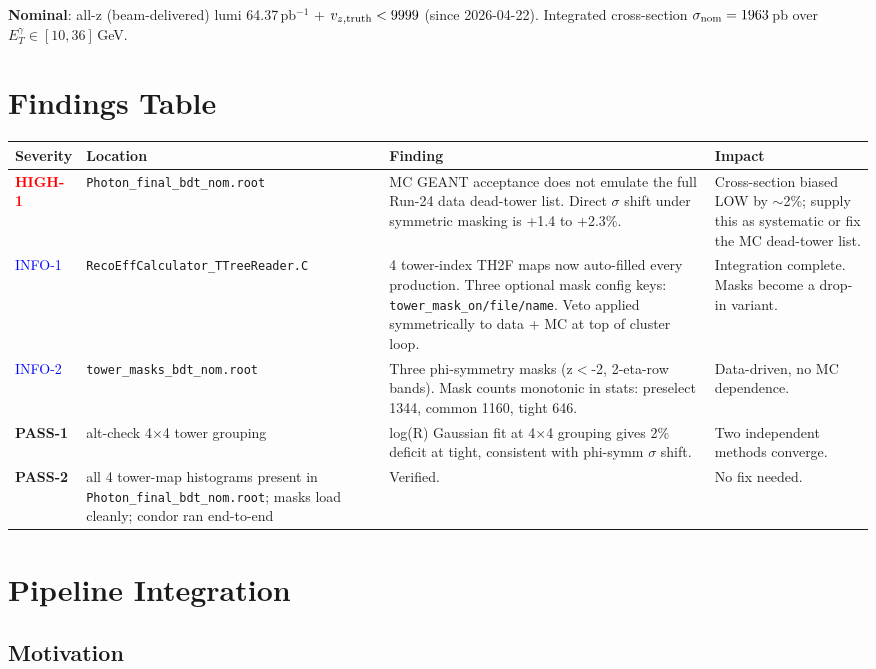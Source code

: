 \documentclass[11pt,a4paper]{article}
\newcommand{\etg}{\ensuremath{E_T^\gamma}}
\newcommand{\crit}[1]{\textcolor{red}{\textbf{#1}}}
\newcommand{\info}[1]{\textcolor{blue}{#1}}
\newcommand{\ok}[1]{\textcolor{green!50!black}{\textbf{#1}}}
\begin{document}
\textbf{Nominal}: all-z (beam-delivered) lumi 64.37\,pb$^{-1}$ +
$v_{z,{\rm truth}}<9999$ (since 2026-04-22). Integrated cross-section
$\sigma_{\rm nom} = 1963$\,pb over $\etg \in [10, 36]$\,GeV.

\section{Findings Table}

\begin{longtable}{@{}p{1.9cm}p{4.8cm}p{5.8cm}p{4.3cm}@{}}
\toprule
Severity & Location & Finding & Impact \\
\midrule
\crit{HIGH-1} & \texttt{Photon\_final\_bdt\_nom.root} &
MC GEANT acceptance does not emulate the full Run-24 data dead-tower
list. Direct $\sigma$ shift under symmetric masking is +1.4 to +2.3\%. &
Cross-section biased LOW by $\sim$2\%; supply this as systematic
or fix the MC dead-tower list. \\
\addlinespace
\info{INFO-1} & \texttt{RecoEffCalculator\_TTreeReader.C} &
4 tower-index TH2F maps now auto-filled every production. Three
optional mask config keys: \texttt{tower\_mask\_on/file/name}. Veto
applied symmetrically to data + MC at top of cluster loop. &
Integration complete. Masks become a drop-in variant. \\
\addlinespace
\info{INFO-2} & \texttt{tower\_masks\_bdt\_nom.root} &
Three phi-symmetry masks (z$<$-2, 2-eta-row bands). Mask counts
monotonic in stats: preselect 1344, common 1160, tight 646. &
Data-driven, no MC dependence. \\
\addlinespace
\ok{PASS-1} & alt-check 4$\times$4 tower grouping &
log(R) Gaussian fit at 4$\times$4 grouping gives
2\% deficit at tight, consistent with phi-symm $\sigma$ shift. &
Two independent methods converge. \\
\addlinespace
\ok{PASS-2} & all 4 tower-map histograms present in
\texttt{Photon\_final\_bdt\_nom.root}; masks load cleanly;
condor ran end-to-end & Verified. & No fix needed. \\
\bottomrule
\end{longtable}

\section{Pipeline Integration}

\subsection{Motivation}
\end{document}
